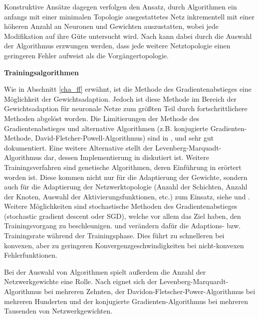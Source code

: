 Konstruktive Ansätze dagegen verfolgen den Ansatz, durch Algorithmen ein anfangs mit einer minimalen Topologie ausgestattetes Netz inkrementell mit einer höheren Anzahl an Neuronen und Gewichten auszustatten, wobei jede Modifikation auf ihre Güte untersucht wird. Nach \cite{Parekh.2000} kann dabei durch die Auswahl der Algorithmus erzwungen werden, dass jede weitere Netztopologie einen geringeren Fehler aufweist als die Vorgängertopologie.


\textbf{Trainingsalgorithmen}

Wie in Abschnitt \ref{cha_ff} erwähnt, ist die Methode des Gradientenabstieges eine Möglichkeit der Gewichtsadaption. Jedoch ist diese Methode im Bereich der Gewichtsadaption für neuronale Netze zum größten Teil durch fortschrittlichere Methoden abgelöst worden. Die Limitierungen der Methode des Gradientenabstieges und alternative Algorithmen (z.B. konjugierte Gradienten-Methode, David-Fletcher-Powell-Algorithmus) sind in \cite{WarrenS.Sarle.1994}, \cite{Masters.1995} und \cite{Bishop.2010} sehr gut dokumentiert. Eine weitere Alternative stellt der Levenberg-Marquadt-Algorithmus dar, dessen Implementierung in \cite{Kollias.March1993} diskutiert ist. Weitere Trainingsverfahren sind genetische Algorithmen, deren Einführung in \cite{Hassoun.1996} erörtert worden ist. Diese kommen nicht nur für die Adaptierung der Gewichte, sondern auch für die Adaptierung der Netzwerktopologie (Anzahl der Schichten, Anzahl der Knoten, Auswahl der Aktivierungsfunktionen, etc.) zum Einsatz, siehe \cite{Bayer.2009} und \cite{StevenA.Harp.1992}.  \\
Weitere Möglichkeiten sind stochastische Methoden des Gradientenabstieges (stochastic gradient descent oder SGD), welche vor allem das Ziel haben, den Trainingsvorgang zu beschleunigen. \cite{JohnDuchi.2010} und \cite{Zeiler.12222012} verändern dafür die Adaptions- bzw. Trainingsrate während der Trainingsphase. Dies führt zu schnelleren bei konvexen, aber zu geringeren Konvergenzgeschwindigkeiten bei nicht-konvexen Fehlerfunktionen. 


Bei der Auswahl von Algorithmen spielt außerdem  die Anzahl der Netzwerkgewichte eine Rolle. Nach \cite{WarrenS.Sarle.1994} eignet sich der Levenberg-Marquardt-Algorithmus bei mehreren Zehnten, der Davidon-Fletscher-Power-Algorithmus bei mehreren Hunderten und der konjugierte Gradienten-Algorithmus bei mehreren Tausenden von Netzwerkgewichten. 















